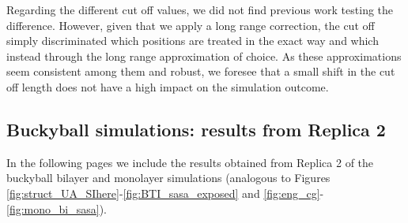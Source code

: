 Regarding the different cut off values, we did not find previous work testing the difference. However, given that we apply a long range correction, the cut off simply discriminated which positions are treated in the exact way and which instead through the long range approximation of choice. As these approximations seem consistent among them and robust, we foresee that a small shift in the cut off length does not have a high impact on the simulation outcome.


\subsection{Buckyball simulations: results from Replica 2}

In the following pages we include the results obtained from Replica 2 of the buckyball bilayer and monolayer simulations (analogous to Figures \ref{fig:struct_UA_SIhere}-\ref{fig:BTI_sasa_exposed} and \ref{fig:eng_cg}-\ref{fig:mono_bi_sasa}).

